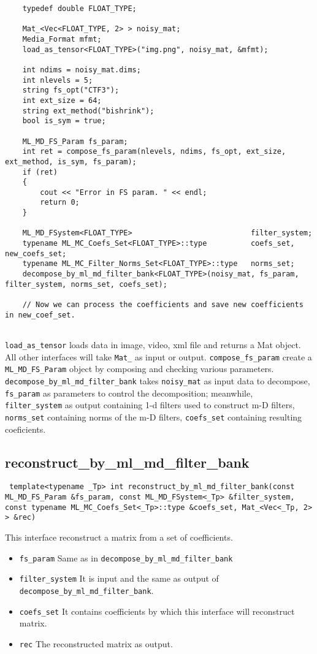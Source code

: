 \documentclass[a4paper,5pt]{article}
\begin{document}
\begin{lstlisting}
	typedef double FLOAT_TYPE;

	Mat_<Vec<FLOAT_TYPE, 2> > noisy_mat;
	Media_Format mfmt;
	load_as_tensor<FLOAT_TYPE>("img.png", noisy_mat, &mfmt);
	
	int ndims = noisy_mat.dims;
	int nlevels = 5;
	string fs_opt("CTF3");
	int ext_size = 64;
	string ext_method("bishrink");
	bool is_sym = true;

	ML_MD_FS_Param fs_param;
	int ret = compose_fs_param(nlevels, ndims, fs_opt, ext_size, ext_method, is_sym, fs_param);
	if (ret)
	{
		cout << "Error in FS param. " << endl;
		return 0;
	}
	
	ML_MD_FSystem<FLOAT_TYPE> 					        filter_system;
	typename ML_MC_Coefs_Set<FLOAT_TYPE>::type 		    coefs_set, new_coefs_set;
	typename ML_MC_Filter_Norms_Set<FLOAT_TYPE>::type 	norms_set;
	decompose_by_ml_md_filter_bank<FLOAT_TYPE>(noisy_mat, fs_param, filter_system, norms_set, coefs_set);
	
	// Now we can process the coefficients and save new coefficients in new_coef_set.
	
\end{lstlisting}
  \lstinline{load_as_tensor} loads data in image, video, xml file and returns a Mat object. All other interfaces will take \lstinline{Mat_} as input or output.
  \lstinline{compose_fs_param} create a \lstinline{ML_MD_FS_Param} object by composing and checking various parameters.
  \lstinline{decompose_by_ml_md_filter_bank} takes \lstinline{noisy_mat} as input data to decompose, \lstinline{fs_param} as parameters to control the decomposition; meanwhile, \lstinline{ filter_system} as output containing 1-d filters used to construct m-D filters, \lstinline{norms_set} containing norms of the m-D filters, \lstinline{coefs_set} containing resulting coeficients. 


\subsection{reconstruct\_by\_ml\_md\_filter\_bank}

\lstinline{ template<typename _Tp> int reconstruct_by_ml_md_filter_bank(const ML_MD_FS_Param &fs_param, const ML_MD_FSystem<_Tp> &filter_system, const typename ML_MC_Coefs_Set<_Tp>::type &coefs_set, Mat_<Vec<_Tp, 2> > &rec) }

This interface reconstruct a matrix from a set of coefficients.
\begin{itemize}
\item \lstinline{fs_param} Same as in \lstinline{decompose_by_ml_md_filter_bank}
\item \lstinline{filter_system} It is input and the same as output of \lstinline{decompose_by_ml_md_filter_bank}. 

\item \lstinline{coefs_set} It contains coefficients by which this interface will reconstruct matrix.
\item \lstinline{rec} The reconstructed matrix as output. 
\end{itemize}
\end{document}
